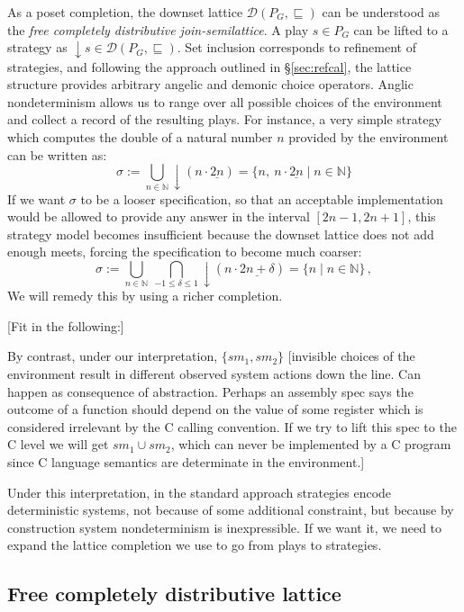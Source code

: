 \documentclass[format=sigplan,authordraft]{acmart}
\begin{document}
As a poset completion,
the downset lattice
$\mathcal{D}(P_G, {\sqsubseteq})$
can be understood as
the \emph{free completely distributive join-semilattice}.
A play $s \in P_G$ can be lifted to a strategy as
${\downarrow} s \in \mathcal{D}(P_G, {\sqsubseteq})$.
Set inclusion corresponds to refinement of strategies,
and following the approach outlined in \S\ref{sec:refcal},
the lattice structure provides
arbitrary angelic and demonic choice operators.
Anglic nondeterminism
allows us to range over all possible choices of the environment
and collect a record of the resulting plays.
For instance,
a very simple strategy which computes
the double of a natural number $n$
provided by the environment
can be written as:
\[
  \sigma :=
    \bigcup_{n \in \mathbb{N}} {\downarrow}(n \cdot \underline{2n}) =
    \{ n, \: n \cdot \underline{2n} \mid n \in \mathbb{N} \}
\]
If we want $\sigma$ to be a looser specification,
so that an acceptable implementation
would be allowed to provide any answer in the interval
$[2n - 1, 2n + 1]$,
this strategy model becomes insufficient
because the downset lattice does not add enough meets,
forcing the specification to become
much coarser:
\[
  \sigma :=
    \bigcup_{n \in \mathbb{N}} \:
    \bigcap_{-1 \le \delta \le 1}
    {\downarrow}(n \cdot \underline{2n+\delta}) =
    \{ n \mid n \in \mathbb{N} \} \,,
\]
We will remedy this by using a richer completion.

[Fit in the following:]

By contrast,
under our interpretation,
$\{ s m_1, s m_2 \}$
[invisible choices of the environment
result in different observed system actions down the line.
Can happen as consequence of abstraction.
Perhaps an assembly spec says
the outcome of a function should depend on the value of some
register which is considered irrelevant by the C calling convention.
If we try to lift this spec to the C level
we will get $s m_1 \cup s m_2$,
which can never be implemented by a C program
since C language semantics are determinate in the environment.]

Under this interpretation,
in the standard approach strategies encode deterministic systems,
not because of some additional constraint,
but because by construction system nondeterminism is inexpressible.
If we want it,
we need to expand the lattice completion we use
to go from plays to strategies.


\subsection{Free completely distributive lattice} \label{sec:fcd} %
\end{document}
